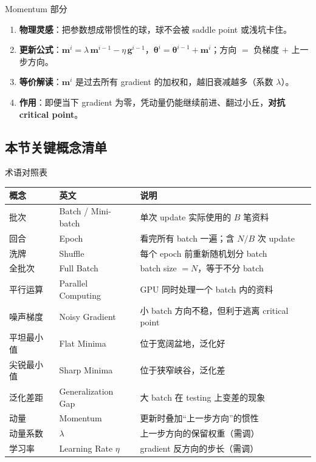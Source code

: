 \documentclass[a4paper]{article}
\begin{document}
\begin{importantbox}{Momentum 部分}
    \begin{enumerate}
        \item \textbf{物理灵感}：把参数想成带惯性的球，球不会被 saddle point 或浅坑卡住。
        \item \textbf{更新公式}：$\boldsymbol{m}^i = \lambda\,\boldsymbol{m}^{i-1} - \eta\,\boldsymbol{g}^{i-1}$，$\boldsymbol{\theta}^i = \boldsymbol{\theta}^{i-1} + \boldsymbol{m}^i$；方向 $=$ 负梯度 $+$ 上一步方向。
        \item \textbf{等价解读}：$\boldsymbol{m}^i$ 是过去所有 gradient 的加权和，越旧衰减越多（系数 $\lambda$）。
        \item \textbf{作用}：即便当下 gradient 为零，凭动量仍能继续前进、翻过小丘，\textbf{对抗 critical point}。
    \end{enumerate}
\end{importantbox}

\subsection{本节关键概念清单}

\begin{knowledgebox}{术语对照表}
    \begin{center}
    \begin{tabular}{lll}
        \toprule
        \textbf{概念} & \textbf{英文} & \textbf{说明} \\
        \midrule
        批次 & Batch / Mini-batch & 单次 update 实际使用的 $B$ 笔资料 \\
        回合 & Epoch & 看完所有 batch 一遍；含 $N/B$ 次 update \\
        洗牌 & Shuffle & 每个 epoch 前重新随机划分 batch \\
        全批次 & Full Batch & batch size $=N$，等于不分 batch \\
        平行运算 & Parallel Computing & GPU 同时处理一个 batch 内的资料 \\
        噪声梯度 & Noisy Gradient & 小 batch 方向不稳，但利于逃离 critical point \\
        平坦最小值 & Flat Minima & 位于宽阔盆地，泛化好 \\
        尖锐最小值 & Sharp Minima & 位于狭窄峡谷，泛化差 \\
        泛化差距 & Generalization Gap & 大 batch 在 testing 上变差的现象 \\
        动量 & Momentum & 更新时叠加``上一步方向''的惯性 \\
        动量系数 & $\lambda$ & 上一步方向的保留权重（需调） \\
        学习率 & Learning Rate $\eta$ & gradient 反方向的步长（需调） \\
        \bottomrule
    \end{tabular}
    \end{center}
\end{knowledgebox}
\end{document}
